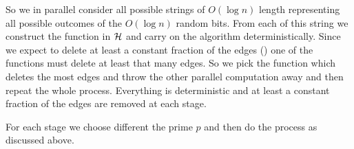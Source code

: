 So we in parallel  consider all possible strings of $O(\log n)$ length representing all possible outcomes of the $O(\log n)$ random bits. From each of this string we construct the function in $\mathcal{H}$ and carry on the algorithm deterministically. Since we expect to delete at least a constant fraction of the edges () one of the functions must delete at least that many edges. So we pick the function which deletes the most edges and throw the other parallel computation away and then repeat the whole process. Everything is deterministic and at least a constant fraction of the edges are removed at each stage. 

For each stage we choose different the prime $p$ and then do the process as discussed above.